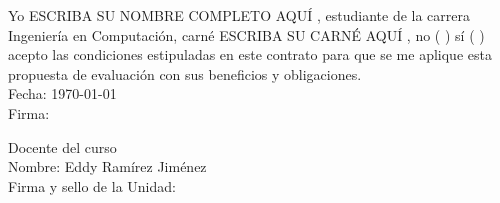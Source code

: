 \documentclass[11pt]{proc}
\newcommand{\nombreEstudiante}{ ESCRIBA SU NOMBRE COMPLETO AQUÍ }
\newcommand{\numCarne}{ ESCRIBA SU CARNÉ AQUÍ }
\begin{document}
\bigskip

Yo \nombreEstudiante, estudiante de la carrera Ingeniería en Computación, carné \numCarne , no ( ) sí ( ) acepto las condiciones estipuladas en este contrato para que se me aplique esta propuesta de evaluación con sus beneficios y obligaciones.    \\
Fecha: \today  \\Firma: 
\bigskip
\bigskip
\bigskip
\bigskip

Docente del curso\\
Nombre: Eddy Ramírez Jiménez 
\\Firma y sello de la Unidad: 
\end{document}
